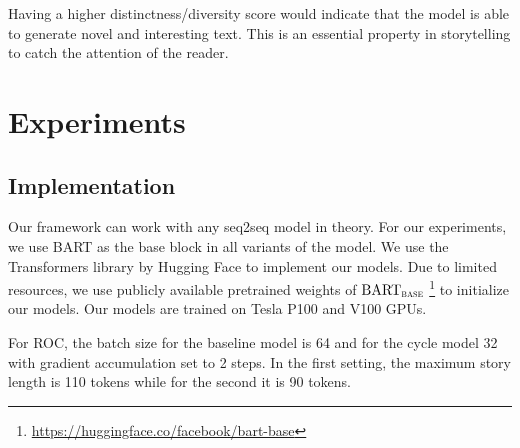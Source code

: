 Having a higher distinctness/diversity score would indicate that the model is able to generate novel and interesting text. This is an essential property in storytelling to catch the attention of the reader.







\section{Experiments}
\label{sec:experiments}

\subsection{Implementation}
\label{sec:implementation}

Our framework can work with any seq2seq model in theory. For our experiments, we use BART as the base block in all variants of the model. We use the Transformers library by Hugging Face \citep{wolf2020transformers} to implement our models. Due to limited resources, we use publicly available pretrained weights of $\text{BART}_\textsc{base}$ \footnote{\url{https://huggingface.co/facebook/bart-base}} to initialize our models. Our models are trained on Tesla P100 and V100 GPUs.

For ROC, the batch size for the baseline model is 64 and for the cycle model 32 with gradient accumulation set to 2 steps. In the first setting, the maximum story length is 110 tokens while for the second it is 90 tokens.

